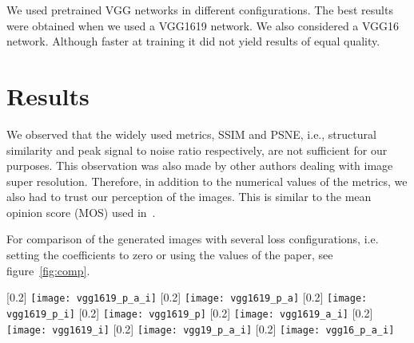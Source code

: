 \documentclass[10pt,twocolumn,letterpaper]{article}
\begin{document}
We used pretrained VGG networks in different configurations. The best
results were obtained when we used a VGG1619 network. We also
considered a VGG16 network. Although faster at training it did not
yield results of equal quality.


\section{Results}
\label{sec:results}


We observed that the widely used metrics, SSIM and PSNE, i.\;e.,
structural similarity and peak signal to noise ratio respectively, are
not sufficient for our purposes. This observation was also made by
other authors dealing with image super resolution. Therefore, in
addition to the numerical values of the metrics, we also had to trust
our perception of the images. This is similar to the mean opinion
score (MOS) used in~\cite{LedigChristian2016PSIS}.

For comparison of the generated images with several loss
configurations, i.e. setting the coefficients to zero or using the
values of the paper, see figure~\ref{fig:comp}.
\begin{figure*}[h]
  \centering
  [0.2\linewidth]{%
    \texttt{[image: vgg1619\_p\_a\_i]}
  }
  [0.2\linewidth]{%
    \texttt{[image: vgg1619\_p\_a]}
  }
  [0.2\linewidth]{%
    \texttt{[image: vgg1619\_p\_i]}
  }
  [0.2\linewidth]{%
    \texttt{[image: vgg1619\_p]}
  }
  [0.2\linewidth]{%
    \texttt{[image: vgg1619\_a\_i]}
  }
  [0.2\linewidth]{%
    \texttt{[image: vgg1619\_i]}
  }
  [0.2\linewidth]{%
    \texttt{[image: vgg19\_p\_a\_i]}
  }
  [0.2\linewidth]{%
    \texttt{[image: vgg16\_p\_a\_i]}
  }
  \label{fig:comp}
  \caption{Comparison of several loss configurations}
\end{figure*}
\end{document}
